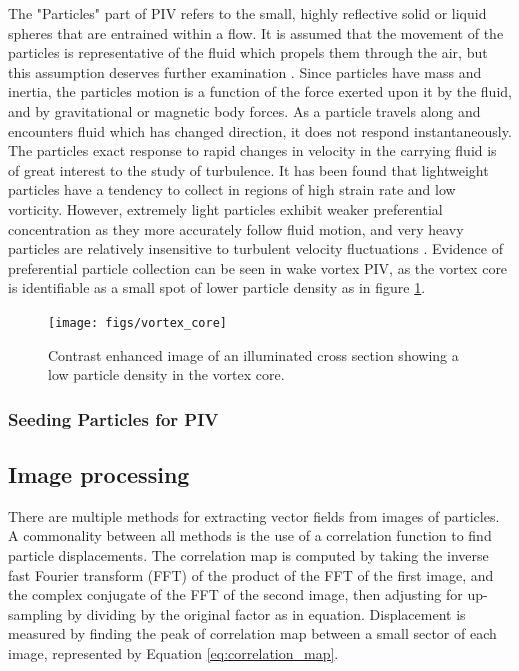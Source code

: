 The "Particles" part of PIV refers to the small, highly reflective solid or 
liquid spheres that are entrained within a flow. It is assumed that the 
movement of the particles is representative of the fluid which propels them 
through the air, but this assumption deserves further examination 
\cite{roscoe1952}. Since particles have mass and inertia, the particles motion 
is a function of the force exerted upon it by the fluid, and by gravitational 
or magnetic body forces. As a particle travels along and encounters fluid which 
has changed direction, it does not respond instantaneously. The particles exact 
response to rapid changes in velocity in the carrying fluid is of great 
interest to the study of turbulence. It has been found that lightweight 
particles have a tendency to collect in regions of high strain rate and low 
vorticity. However, extremely light particles exhibit weaker preferential 
concentration as they more accurately follow fluid motion, and very heavy 
particles are relatively insensitive to turbulent velocity fluctuations 
\cite{squires1990}. Evidence of preferential particle collection can be seen in 
wake vortex PIV, as the vortex core is identifiable as a small spot of lower 
particle density as in figure \ref{fig:vortex_core_particles}.
	
\begin{figure}
	\centering
	\texttt{[image: figs/vortex\_core]}
	\caption{Contrast enhanced image of an illuminated cross section showing a 
	low particle density in the vortex core.}
	\label{fig:vortex_core_particles}
\end{figure}



\subsubsection{Seeding Particles for PIV}

\subsection{Image processing}

There are multiple methods for extracting vector fields from images of 
particles. A commonality between all methods is the use of a correlation 
function to find particle displacements. The correlation map is computed by 
taking the inverse fast Fourier transform (FFT) of the product of the FFT of 
the first image, and the complex conjugate of the FFT of the second image, then 
adjusting for up-sampling by dividing by the original factor as in equation. 
Displacement is measured by finding the peak of correlation map between a small 
sector of each image, represented by Equation \ref{eq:correlation_map}.

